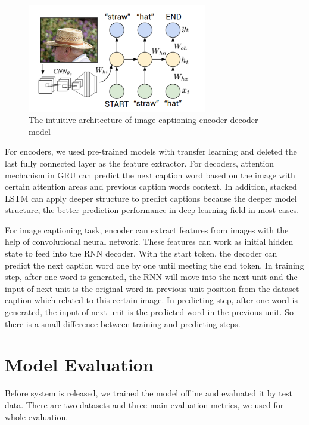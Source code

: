 \documentclass{article}
\begin{document}
\begin{figure}[h]
\centering
\includegraphics[width=0.7\textwidth]{encoder_decoder.png}
\caption{The intuitive architecture of image captioning encoder-decoder model}
\label{fig_encoder_decoder}
\end{figure}

For encoders, we used pre-trained models with transfer learning and deleted the last fully connected layer as the feature extractor. For decoders, attention mechanism in GRU can predict the next caption word based on the image with certain attention areas and previous caption words context. In addition, stacked LSTM can apply deeper structure to predict captions because the deeper model structure, the better prediction performance in deep learning field in most cases. 

For image captioning task, encoder can extract features from images with the help of convolutional neural network. These features can work as initial hidden state to feed into the RNN decoder. With the start token, the decoder can predict the next caption word one by one until meeting the end token. In training step, after one word is generated, the RNN will move into the next unit and the input of next unit is the original word in previous unit position from the dataset caption which related to this certain image. In predicting step, after one word is generated, the input of next unit is the predicted word in the previous unit. So there is a small difference between training and predicting steps.

\section{Model Evaluation}
Before system is released, we trained the model offline and evaluated it by test data. There are two datasets and three main evaluation metrics, we used for whole evaluation.
\end{document}
